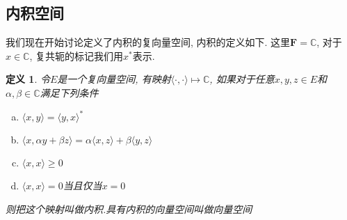 \documentclass{book}
\newtheorem{definition}{\hspace{2em}定义}[section]
\begin{document}
\subsection*{内积空间}
我们现在开始讨论定义了内积的复向量空间, 内积的定义如下. 这里$\mathbf{F}=\mathbb{C}$, 对于$x\in\mathbb{C}$, 复共轭的标记我们用$x^*$表示.
\begin{definition}\label{inner def}
  令$E$是一个复向量空间, 有映射$\langle\cdot,\cdot\rangle\mapsto\mathbb{C}$, 如果对于任意$x,y,z\in E$和$\alpha,\beta\in \mathbb{C}$满足下列条件
  \begin{enumerate}[(a)]
    \item\label{inner a} $\langle x,y\rangle=\langle y,x\rangle^*$
    \item\label{inner b} $\langle x,\alpha y+\beta z\rangle=\alpha\langle x,z\rangle+\beta\langle y,z\rangle$
    \item $\langle x,x\rangle\geq 0$
    \item $\langle x,x\rangle=0$当且仅当$x=0$
  \end{enumerate}
  则把这个映射叫做内积.具有内积的向量空间叫做向量空间
\end{definition}
\end{document}
